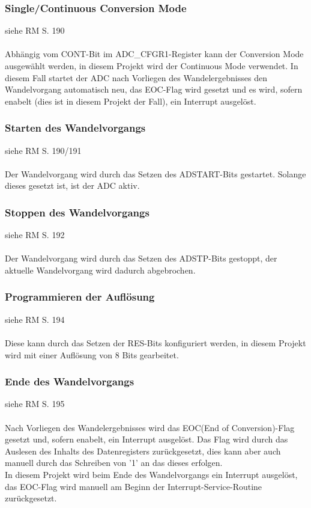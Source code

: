 \documentclass[11pt]{report}
\begin{document}
			\subsubsection{Single/Continuous Conversion Mode}
				siehe RM S. 190\\
				\\Abhängig vom CONT-Bit im ADC\_CFGR1-Register kann der Conversion Mode ausgewählt werden, in diesem Projekt wird der Continuous Mode verwendet. In diesem Fall startet der ADC nach Vorliegen des Wandelergebnisses den Wandelvorgang automatisch neu, das EOC-Flag wird gesetzt und es wird, sofern enabelt (dies ist in diesem Projekt der Fall), ein Interrupt ausgelöst.
			\subsubsection{Starten des Wandelvorgangs}
				siehe RM S. 190/191\\
				\\Der Wandelvorgang wird durch das Setzen des ADSTART-Bits gestartet. Solange dieses gesetzt ist, ist der ADC aktiv.
			\subsubsection{Stoppen des Wandelvorgangs}
				siehe RM S. 192\\
				\\Der Wandelvorgang wird durch das Setzen des ADSTP-Bits gestoppt, der aktuelle Wandelvorgang wird dadurch abgebrochen.
			\subsubsection{Programmieren der Auflösung}
				siehe RM S. 194\\
				\\Diese kann durch das Setzen der RES-Bits konfiguriert werden, in diesem Projekt wird mit einer Auflösung von 8 Bits gearbeitet.
			\subsubsection{Ende des Wandelvorgangs}
				siehe RM S. 195\\
				\\Nach Vorliegen des Wandelergebnisses wird das EOC(End of Conversion)-Flag gesetzt und, sofern enabelt, ein Interrupt ausgelöst. Das Flag wird durch das Auslesen des Inhalts des Datenregisters zurückgesetzt, dies kann aber auch manuell durch das Schreiben von '1' an das dieses erfolgen.\\
				In diesem Projekt wird beim Ende des Wandelvorgangs ein Interrupt ausgelöst, das EOC-Flag wird manuell am Beginn der Interrupt-Service-Routine zurückgesetzt.
\end{document}
